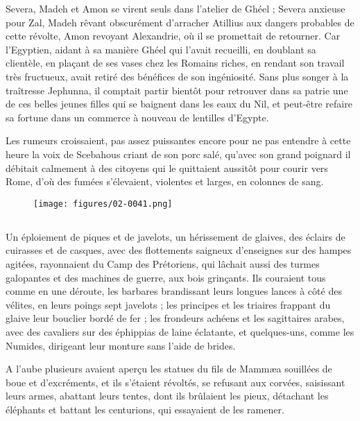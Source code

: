 \documentclass[a4paper, 11pt, oneside, polutonikogreek, french]{article}
\begin{document}
Severa, Madeh et Amon se virent seuls dans l'atelier de Ghéel ; Severa anxieuse pour Zal, Madeh rêvant obscurément d'arracher Atillius aux dangers probables de cette révolte, Amon revoyant Alexandrie, où il se promettait de retourner. Car l'Egyptien, aidant à sa manière Ghéel qui l'avait recueilli, en doublant sa clientèle, en plaçant de ses vases chez les Romains riches, en rendant son travail très fructueux, avait retiré des bénéfices de son ingéniosité. Sans plus songer à la traîtresse Jephunna, il comptait partir bientôt pour retrouver dans sa patrie une de ces belles jeunes filles qui se baignent dans les eaux du Nil, et peut-être refaire sa fortune dans un commerce à nouveau de lentilles d'Egypte.

Les rumeurs croissaient, pas assez puissantes encore pour ne pas entendre à cette heure la voix de Scebahous criant de son porc salé, qu'avec son grand poignard il débitait calmement à des citoyens qui le quittaient aussitôt pour courir vers Rome, d'où des fumées s'élevaient, violentes et larges, en colonnes de sang.
\begin{figure}[H]
\centering
\texttt{[image: figures/02-0041.png]}
\end{figure}
\clearpage
\subsection{}
\paragraph{}
Un éploiement de piques et de javelots, un hérissement de glaives, des éclairs de cuirasses et de casques, avec des flottements saigneux d'enseignes sur des hampes agitées, rayonnaient du Camp des Prétoriens, qui lâchait aussi des turmes galopantes et des machines de guerre, aux bois grinçants. Ils couraient tous comme en une déroute, les barbares brandissant leurs longues lances à côté des vélites, en leurs poings sept javelots ; les principes et les triaires frappant du glaive leur bouclier bordé de fer ; les frondeurs achéens et les sagittaires arabes, avec des cavaliers sur des éphippias de laine éclatante, et quelques-uns, comme les Numides, dirigeant leur monture sans l'aide de brides.

A l'aube plusieurs avaient aperçu les statues du fils de Mammæa souillées de boue et d'excréments, et ils s'étaient révoltés, se refusant aux corvées, saisissant leurs armes, abattant leurs tentes, dont ils brûlaient les pieux, détachant les éléphants et battant les centurions, qui essayaient de les ramener.
\end{document}
